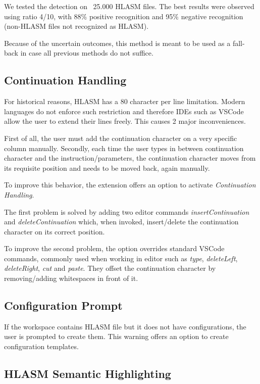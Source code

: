 We tested the detection on ~25.000 HLASM files. The best results were observed using ratio 4/10, with 88\% positive recognition and 95\% negative recognition (non-HLASM files not recognized as HLASM). 

Because of the uncertain outcomes, this method is meant to be used as a fall-back in case all previous methods do not suffice.

\subsection{Continuation Handling}

For historical reasons, HLASM has a 80 character per line limitation. Modern languages do not enforce such restriction and therefore IDEs such as VSCode allow the user to extend their lines freely. This causes 2 major inconveniences.

First of all, the user must add the continuation character on a very specific column manually. Secondly, each time the user types in between continuation character and the instruction/parameters, the continuation character moves from its requisite position and needs to be moved back, again manually.

To improve this behavior, the extension offers an option to activate \emph{Continuation Handling}. 

The first problem is solved by adding two editor commands \emph{insertContinuation} and \emph{deleteContinuation} which, when invoked, insert/delete the continuation character on its correct position.

To improve the second problem, the option overrides standard VSCode commands, commonly used when working in editor such as \emph{type}, \emph{deleteLeft}, \emph{deleteRight}, \emph{cut} and \emph{paste}. They offset the continuation character by removing/adding whitespaces in front of it.


\subsection{Configuration Prompt}

If the workspace contains HLASM file but it does not have configurations, the user is prompted to create them. This warning offers an option to create configuration templates.

\subsection{HLASM Semantic Highlighting}

